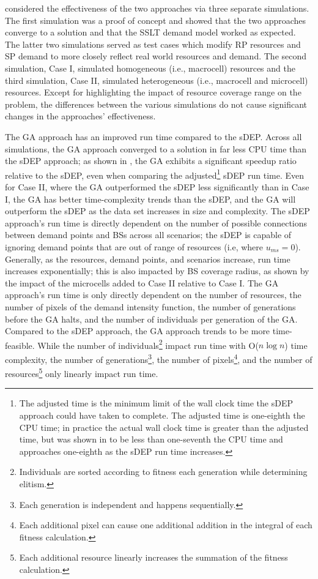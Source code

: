 \documentclass[12pt,dvipsnames]{report}
\begin{document}
 considered the effectiveness of the two approaches via three separate simulations.  The first simulation was a proof of concept and showed that the two approaches converge to a solution and that the SSLT demand model worked as expected.  The latter two simulations served as test cases which modify RP resources and SP demand to more closely reflect real world resources and demand.  The second simulation, Case I, simulated homogeneous (i.e., macrocell) resources and the third simulation, Case II, simulated heterogeneous (i.e., macrocell and microcell) resources.  Except for highlighting the impact of resource coverage range on the problem, the differences between the various simulations do not cause significant changes in the approaches' effectiveness.

The GA approach has an improved run time compared to the sDEP.  Across all simulations, the GA approach converged to a solution in far less CPU time than the sDEP approach; as shown in , the GA exhibits a significant speedup ratio relative to the sDEP, even when comparing the adjusted\footnote{The adjusted time is the minimum limit of the wall clock time the sDEP approach could have taken to complete.  The adjusted time is one-eighth the CPU time; in practice the actual wall clock time is greater than the adjusted time, but was shown in  to be less than one-seventh the CPU time and approaches one-eighth as the sDEP run time increases.} sDEP run time.  Even for Case II, where the GA outperformed the sDEP less significantly than in Case I, the GA has better time-complexity trends than the sDEP, and the GA will outperform the sDEP as the data set increases in size and complexity.  The sDEP approach's run time is directly dependent on the number of possible connections between demand points and BSs across all scenarios; the sDEP is capable of ignoring demand points that are out of range of resources (i.e, where $u_{ms}=0$).  Generally, as the resources, demand points, and scenarios increase, run time increases exponentially; this is also impacted by BS coverage radius, as shown by the impact of the microcells added to Case II relative to Case I.  The GA approach's run time is only directly dependent on the number of resources, the number of pixels of the demand intensity function, the number of generations before the GA halts, and the number of individuals per generation of the GA.  Compared to the sDEP approach, the GA approach trends to be more time-feasible.  While the number of individuals\footnote{Individuals are sorted according to fitness each generation while determining elitism.} impact run time with O($n \log n$) time complexity, the number of generations\footnote{Each generation is independent and happens sequentially.}, the number of pixels\footnote{Each additional pixel can cause one additional addition in the integral of each fitness calculation.}, and the number of resources\footnote{Each additional resource linearly increases the summation of the fitness calculation.} only linearly impact run time.
\end{document}
